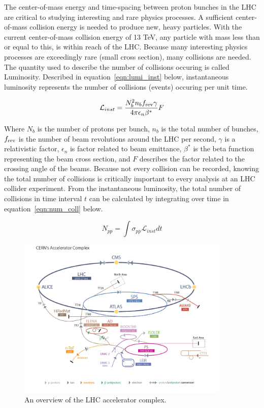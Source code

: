 The center-of-mass energy and time-spacing between proton bunches in the LHC are critical to studying interesting
and rare physics processes. A sufficient center-of-mass collision energy is needed to produce new, heavy particles.
With the current center-of-mass collision energy of 13 TeV, any particle with mass less than or equal to this, is 
within reach of the LHC. Because many interesting physics processes are exceedingly rare (small cross section), many collisions
are needed. The quantity used to describe the number of collisions occuring is called Luminosity.
Described in equation~\ref{eqn:lumi_inst} below, instantaneous luminosity represents the number of collisions (events) occuring per unit time.

\begin{equation}
\label{eqn:lumi_inst}
 \mathcal{L}_{inst} = \frac{N_{b}^{2}n_{b}f_{\textnormal{rev}}\gamma}{4\pi \epsilon_{n} \beta^{*}}F
\end{equation}

Where $N_{b}$ is the number of protons per bunch, $n_{b}$ is the total number of bunches, $f_{\textnormal{rev}}$ is the number of beam revolutions around the LHC per
second, $\gamma$ is a relativistic factor, $\epsilon_{n}$ is factor related to beam emittance, $\beta^{*}$ is the beta function representing the beam cross section, and
$F$ describes the factor related to the crossing angle of the beams. Because not every collision can be recorded, knowing the total number of collisions is critically important
to every analysis at an LHC collider experiment. From the instantaneous luminosity, the total number of collisions in time interval $t$ can be calculated by integrating over time
in equation~\ref{eqn:num_coll} below. 

\begin{equation}
\label{eqn:num_coll}
N_{pp} = \int \sigma_{pp}\mathcal{L}_{inst}dt 
\end{equation}


\begin{figure}[hbtp]
 \begin{center}
   \includegraphics[width=0.9\textwidth]{lhc_complex.pdf}
   \caption[text in square brackets]{An overview of the LHC accelerator complex.}
   \label{fig:lhc_complex}
 \end{center}
\end{figure}





